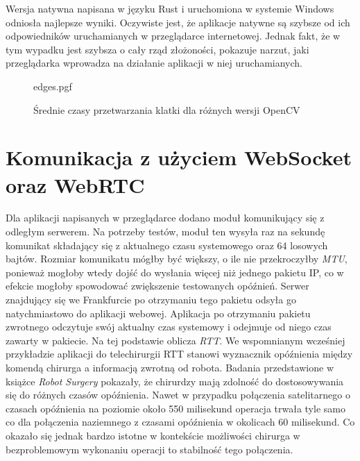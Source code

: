 \documentclass[language=polish,type=master]{aghmodern}
\begin{document}
Wersja natywna napisana w języku Rust i uruchomiona w systemie Windows odniosła najlepsze wyniki.
Oczywiste jest, że aplikacje natywne są szybsze od ich odpowiedników uruchamianych w przeglądarce internetowej.
Jednak fakt, że w tym wypadku jest szybsza o cały rząd złożoności, pokazuje narzut, jaki przeglądarka wprowadza na działanie aplikacji w niej uruchamianych.

\begin{figure}[H]
    \centering
    {edges.pgf}
    \caption{Średnie czasy przetwarzania klatki dla różnych wersji OpenCV}
    \label{fig:edges}
\end{figure}

\section{Komunikacja z użyciem WebSocket oraz WebRTC}
Dla aplikacji napisanych w przeglądarce dodano moduł komunikujący się z odległym serwerem.
Na potrzeby testów, moduł ten wysyła raz na sekundę komunikat składający się z aktualnego czasu systemowego oraz 64 losowych bajtów.
Rozmiar komunikatu mógłby być większy, o ile nie przekroczyłby \emph{MTU}\footnotemark{}, ponieważ mogłoby wtedy dojść do wysłania więcej niż jednego pakietu IP, co w efekcie mogłoby spowodować zwiększenie testowanych opóźnień.
Serwer znajdujący się we Frankfurcie po otrzymaniu tego pakietu odsyła go natychmiastowo do aplikacji webowej.
Aplikacja po otrzymaniu pakietu zwrotnego odczytuje swój aktualny czas systemowy i odejmuje od niego czas zawarty w pakiecie.
Na tej podstawie oblicza \emph{RTT}\footnotemark{}.
We wspomnianym wcześniej przykładzie aplikacji do telechirurgii RTT stanowi wyznacznik opóźnienia między komendą chirurga a informacją zwrotną od robota.
Badania przedstawione w książce \emph{Robot Surgery} \cite{telesurgery} pokazały, że chirurdzy mają zdolność do dostosowywania się do różnych czasów opóźnienia.
Nawet w przypadku połączenia satelitarnego o czasach opóźnienia na poziomie około 550 milisekund operacja trwała tyle samo co dla połączenia naziemnego z czasami opóźnienia w okolicach 60 milisekund.
Co okazało się jednak bardzo istotne w kontekście możliwości chirurga w bezproblemowym wykonaniu operacji to stabilność tego połączenia.
\end{document}
